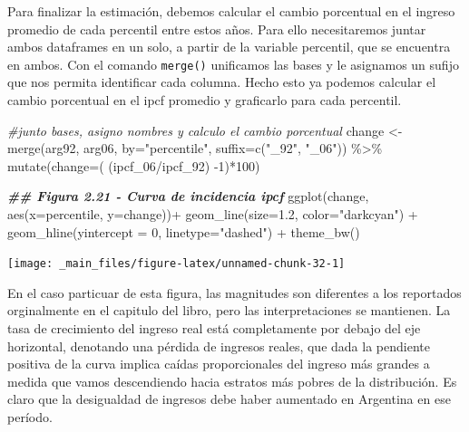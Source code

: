 \documentclass[
]{book}
\newenvironment{Shaded}{\begin{snugshade}}{\end{snugshade}}
\newcommand{\AttributeTok}[1]{\textcolor[rgb]{0.77,0.63,0.00}{#1}}
\newcommand{\CommentTok}[1]{\textcolor[rgb]{0.56,0.35,0.01}{\textit{#1}}}
\newcommand{\DecValTok}[1]{\textcolor[rgb]{0.00,0.00,0.81}{#1}}
\newcommand{\DocumentationTok}[1]{\textcolor[rgb]{0.56,0.35,0.01}{\textbf{\textit{#1}}}}
\newcommand{\FloatTok}[1]{\textcolor[rgb]{0.00,0.00,0.81}{#1}}
\newcommand{\FunctionTok}[1]{\textcolor[rgb]{0.00,0.00,0.00}{#1}}
\newcommand{\NormalTok}[1]{#1}
\newcommand{\OtherTok}[1]{\textcolor[rgb]{0.56,0.35,0.01}{#1}}
\newcommand{\SpecialCharTok}[1]{\textcolor[rgb]{0.00,0.00,0.00}{#1}}
\newcommand{\StringTok}[1]{\textcolor[rgb]{0.31,0.60,0.02}{#1}}
\begin{document}
Para finalizar la estimación, debemos calcular el cambio porcentual en el ingreso promedio de cada percentil entre estos años. Para ello necesitaremos juntar ambos dataframes en un solo, a partir de la variable percentil, que se encuentra en ambos. Con el comando \texttt{merge()} unificamos las bases y le asignamos un sufijo que nos permita identificar cada columna. Hecho esto ya podemos calcular el cambio porcentual en el ipcf promedio y graficarlo para cada percentil.

\begin{Shaded}
\begin{Highlighting}[]
\CommentTok{\#junto bases, asigno nombres y calculo el cambio porcentual}
\NormalTok{change }\OtherTok{\textless{}{-}} \FunctionTok{merge}\NormalTok{(arg92, arg06, }\AttributeTok{by=}\StringTok{"percentile"}\NormalTok{, }\AttributeTok{suffix=}\FunctionTok{c}\NormalTok{(}\StringTok{"\_92"}\NormalTok{, }\StringTok{"\_06"}\NormalTok{)) }\SpecialCharTok{\%\textgreater{}\%} 
          \FunctionTok{mutate}\NormalTok{(}\AttributeTok{change=}\NormalTok{( (ipcf\_06}\SpecialCharTok{/}\NormalTok{ipcf\_92) }\SpecialCharTok{{-}}\DecValTok{1}\NormalTok{)}\SpecialCharTok{*}\DecValTok{100}\NormalTok{) }


\DocumentationTok{\#\# Figura 2.21 {-} Curva de incidencia ipcf}
\FunctionTok{ggplot}\NormalTok{(change,}
       \FunctionTok{aes}\NormalTok{(}\AttributeTok{x=}\NormalTok{percentile, }\AttributeTok{y=}\NormalTok{change))}\SpecialCharTok{+}
  \FunctionTok{geom\_line}\NormalTok{(}\AttributeTok{size=}\FloatTok{1.2}\NormalTok{, }\AttributeTok{color=}\StringTok{"darkcyan"}\NormalTok{) }\SpecialCharTok{+}
  \FunctionTok{geom\_hline}\NormalTok{(}\AttributeTok{yintercept =} \DecValTok{0}\NormalTok{, }\AttributeTok{linetype=}\StringTok{"dashed"}\NormalTok{) }\SpecialCharTok{+}
  \FunctionTok{theme\_bw}\NormalTok{()}
\end{Highlighting}
\end{Shaded}

\texttt{[image: \_main\_files/figure-latex/unnamed-chunk-32-1]}

En el caso particuar de esta figura, las magnitudes son diferentes a los reportados orginalmente en el capitulo del libro, pero las interpretaciones se mantienen. La tasa de crecimiento del ingreso
real está completamente por debajo del eje horizontal, denotando una pérdida de ingresos reales, que dada la pendiente positiva de la curva implica caídas proporcionales del ingreso más grandes a medida que vamos descendiendo hacia estratos más pobres de la distribución. Es claro que la desigualdad de ingresos debe haber aumentado en Argentina en ese período.
\end{document}
